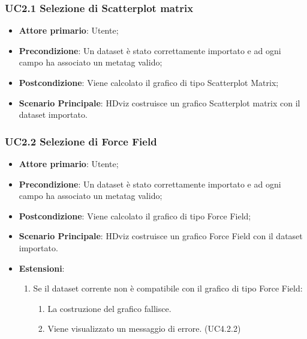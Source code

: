\subsubsection{UC2.1 Selezione di Scatterplot matrix}
\label{ssub:UC2.1}
\begin{itemize}

    \item \textbf{Attore primario}: Utente;

    \item \textbf{Precondizione}:   Un dataset è stato correttamente importato e ad ogni campo ha associato
                                    un metatag valido;

    \item \textbf{Postcondizione}:  Viene calcolato il grafico di tipo Scatterplot Matrix;

	\item \textbf{Scenario Principale}: HDviz costruisce un grafico Scatterplot matrix con il dataset 
										importato.
\end{itemize}


\subsubsection{UC2.2 Selezione di Force Field}
\label{ssub:UC2.2}
\begin{itemize}

    \item \textbf{Attore primario}: Utente;

    \item \textbf{Precondizione}:   Un dataset è stato correttamente importato e ad ogni campo ha associato
                                    un metatag valido;

    \item \textbf{Postcondizione}:  Viene calcolato il grafico di tipo Force Field;
	
	\item \textbf{Scenario Principale}: HDviz costruisce un grafico Force Field con il dataset importato.
	\item \textbf{Estensioni}:
	\begin{enumerate}
		\item Se il dataset corrente non è compatibile con il grafico di tipo Force Field:
		\begin{enumerate}
			\item La costruzione del grafico fallisce.
			\item Viene visualizzato un messaggio di errore. (UC4.2.2)
		\end{enumerate}
	\end{enumerate}
\end{itemize}


